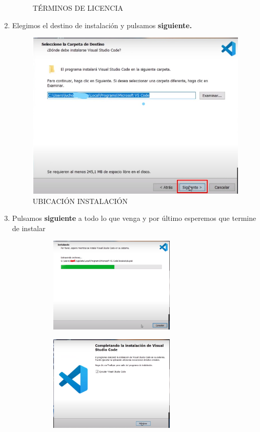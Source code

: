 \begin{enumerate}
\begin{figure}[H]
    \caption{TÉRMINOS DE LICENCIA}
\end{figure}
\item Elegimos el destino de instalación y pulsamos \textbf{siguiente. }
\begin{figure}[H]
    \centering
    \includegraphics[width = 10 cm]{img/parte3codes.png}
    \caption{UBICACIÓN INSTALACIÓN}
\end{figure}
\newpage
\item Pulsamos \textbf{siguiente} a todo lo que venga y por último esperemos que termine de instalar 
\begin{figure}[H]
\centering
\begin{subfigure}{0.5\textwidth}
\includegraphics[width=6cm ]{img/CARGUECODE.png}
\end{subfigure}
\begin{subfigure}{0.5\textwidth}
\includegraphics[width=6cm]{img/finalcode.png}
\end{subfigure}
\end{figure}


\end{enumerate}

